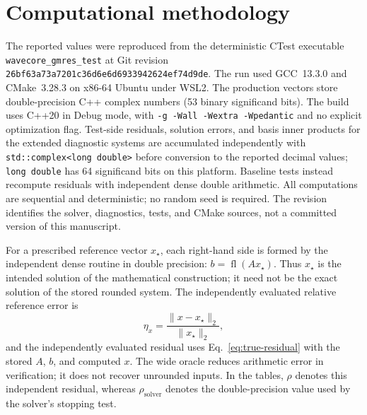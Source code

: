 \section{Computational methodology}

The reported values were reproduced from the deterministic CTest executable
\nolinkurl{wavecore_gmres_test} at Git revision
\nolinkurl{26bf63a73a7201c36d6e6d6933942624ef74d9de}. The run used GCC~13.3.0 and
CMake~3.28.3 on x86-64 Ubuntu under WSL2. The production vectors store
double-precision C++ complex numbers (53 binary significand bits). The build uses
C++20 in Debug mode, with \texttt{-g -Wall -Wextra -Wpedantic} and no explicit
optimization flag. Test-side residuals, solution errors, and basis inner products
for the extended diagnostic systems are accumulated independently with
\texttt{std::complex<long double>} before conversion to the reported decimal
values; \texttt{long double} has 64 significand bits on this platform. Baseline
tests instead recompute residuals with independent dense double arithmetic.
All computations are sequential and deterministic; no random seed is required.
The revision identifies the solver, diagnostics, tests, and CMake sources, not a
committed version of this manuscript.

For a prescribed reference vector $x_\star$, each right-hand side is formed by
the independent dense routine in double precision:
$b=\operatorname{fl}(Ax_\star)$. Thus $x_\star$ is the intended solution of the
mathematical construction; it need not be the exact solution of the stored
rounded system. The independently evaluated relative reference error is
\begin{equation}
    \eta_x=\frac{\lVert x-x_\star\rVert_2}{\lVert x_\star\rVert_2},
\end{equation}
and the independently evaluated residual uses Eq.~\eqref{eq:true-residual} with
the stored $A$, $b$, and computed $x$. The wide oracle reduces arithmetic error
in verification; it does not recover unrounded inputs. In the tables, $\rho$
denotes this independent residual, whereas $\rho_{\mathrm{solver}}$ denotes the
double-precision value used by the solver's stopping test.


